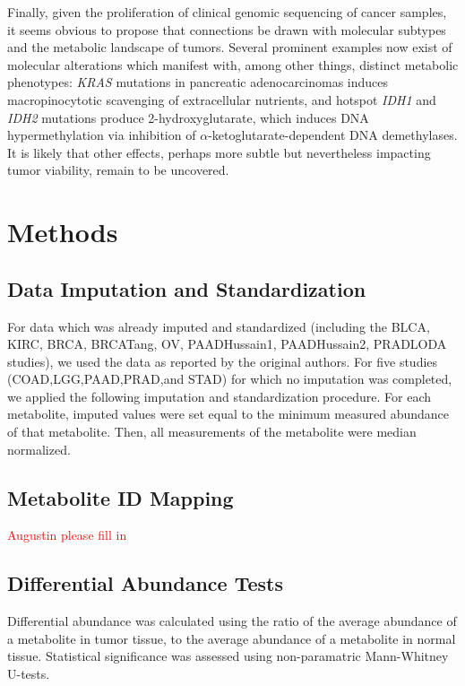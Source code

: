 \documentclass[10pt]{article}
\begin{document}
Finally, given the proliferation of clinical genomic sequencing of cancer samples, it seems obvious to propose that connections be drawn with molecular subtypes and the metabolic landscape of tumors. Several prominent examples now exist of molecular alterations which manifest with, among other things, distinct metabolic phenotypes: \textit{KRAS} mutations in pancreatic adenocarcinomas induces macropinocytotic scavenging of extracellular nutrients, and hotspot \textit{IDH1} and \textit{IDH2} mutations produce 2-hydroxyglutarate, which induces DNA hypermethylation via inhibition of $\alpha$-ketoglutarate-dependent DNA demethylases. It is likely that other effects, perhaps more subtle but nevertheless impacting tumor viability, remain to be uncovered.



\section{Methods}

\subsection{Data Imputation and Standardization}
For data which was already imputed and standardized (including the BLCA, KIRC, BRCA, BRCATang, OV, PAADHussain1, PAADHussain2, PRADLODA studies), we used the data as reported by the original authors. For five studies (COAD,LGG,PAAD,PRAD,and STAD) for which no imputation was completed, we applied the following imputation and standardization procedure. For each metabolite, imputed values were set equal to the minimum measured abundance of that metabolite. Then, all measurements of the metabolite were median normalized. 

\subsection{Metabolite ID Mapping}
\textcolor{red}{Augustin please fill in}

\subsection{Differential Abundance Tests}
Differential abundance was calculated using the ratio of the average abundance of a metabolite in tumor tissue, to the average abundance of a metabolite in normal tissue. Statistical significance was assessed using non-paramatric Mann-Whitney U-tests.
\end{document}
